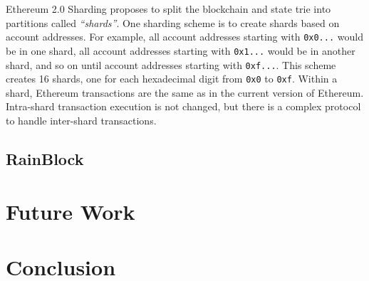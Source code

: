 \documentclass[12pt]{article}
\newcounter{protocol}
\newcommand{\System}{Stateless Clients\xspace}
\begin{document}
Ethereum 2.0 Sharding proposes to split the blockchain and state trie into partitions called \emph{``shards''}. One sharding scheme is to create shards based on account addresses. For example, all account addresses starting with \texttt{0x0...} would be in one shard, all account addresses starting with \texttt{0x1...} would be in another shard, and so on until account addresses starting with \texttt{0xf...}. This scheme creates 16 shards, one for each hexadecimal digit from \texttt{0x0} to \texttt{0xf}. Within a shard, Ethereum transactions are the same as in the current version of Ethereum. Intra-shard transaction execution is not changed, but there is a complex protocol to handle inter-shard transactions. %
\fi


\subsection{RainBlock} \label{subsection:rainblock}


\section{Future Work}

\section{Conclusion}
\end{document}
